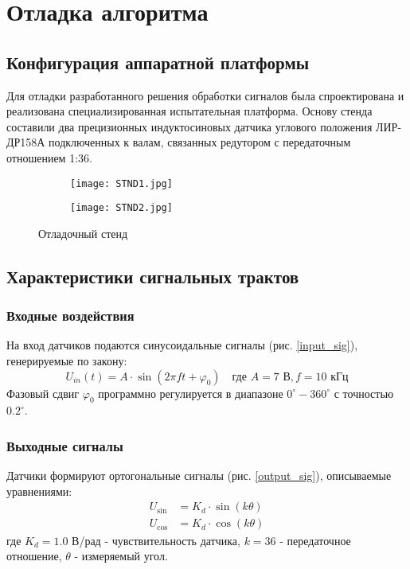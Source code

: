 \section{Отладка алгоритма}

\subsection{Конфигурация аппаратной платформы}
Для отладки разработанного решения обработки сигналов была спроектирована и реализована специализированная 
испытательная платформа. 
Основу стенда составили два прецизионных индуктосиновых датчика углового положения ЛИР-ДР158А подключенных к валам, связанных редутором 
с передаточным отношением 1:36.

\begin{figure}[!h]
  \centering
  \begin{subfigure}[b]{0.6\textwidth}
    \centering
    \texttt{[image: STND1.jpg]} 
    \label{STND1}
  \end{subfigure}
  \hfill
  \begin{subfigure}[b]{0.35\textwidth}
    \centering
    \texttt{[image: STND2.jpg]} 
    \label{STND2}
  \end{subfigure}

  \caption{Отладочный стенд}
  \label{STND} 
\end{figure}


\subsection{Характеристики сигнальных трактов}
\subsubsection{Входные воздействия}
На вход датчиков подаются синусоидальные сигналы (рис. \ref{input_sig}), генерируемые по закону:
\begin{equation}
    U_{in}(t) = A \cdot \sin(2\pi f t + \varphi_0) \quad \text{где } A = 7 \text{ В}, f = 10 \text{ кГц}
\end{equation}
Фазовый сдвиг $\varphi_0$ программно регулируется в диапазоне $0^\circ - 360^\circ$ с точностью $0.2^\circ$.

\subsubsection{Выходные сигналы}
Датчики формируют ортогональные сигналы (рис. \ref{output_sig}), описываемые уравнениями:
\begin{align}
    U_{\sin} &= K_d \cdot \sin(k\theta) \\
    U_{\cos} &= K_d \cdot \cos(k\theta)
\end{align}
где $K_d = 1.0$ В/рад - чувствительность датчика, $k=36$ - передаточное отношение, $\theta$ - измеряемый угол.

